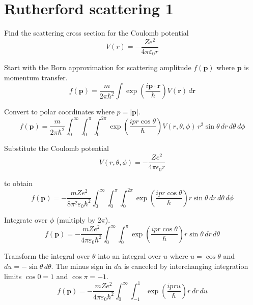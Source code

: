 


\section*{Rutherford scattering 1}

Find the scattering cross section for the Coulomb potential
\begin{equation*}
V(r)=-\frac{Ze^2}{4\pi\varepsilon_0r}
\end{equation*}

Start with the Born approximation for scattering amplitude
$f(\mathbf p)$ where $\mathbf p$ is momentum transfer.
\begin{equation*}
f(\mathbf p)
=\frac{m}{2\pi\hbar^2}
\int\exp\left(\frac{i\mathbf p\cdot\mathbf r}{\hbar}\right)V(\mathbf r)\,d\mathbf r
\end{equation*}

Convert to polar coordinates where $p=|\mathbf p|$.
\begin{equation*}
f(\mathbf p)
=\frac{m}{2\pi\hbar^2}
\int_0^\infty
\int_0^\pi
\int_0^{2\pi}
\exp\left(\frac{ipr\cos\theta}{\hbar}\right)V(r,\theta,\phi)
\,r^2\sin\theta\,dr\,d\theta\,d\phi
\end{equation*}

Substitute the Coulomb potential
\begin{equation*}
V(r,\theta,\phi)=-\frac{Ze^2}{4\pi\epsilon_0r}
\end{equation*}

to obtain
\begin{equation*}
f(\mathbf p)
=-\frac{mZe^2}{8\pi^2\varepsilon_0\hbar^2}
\int_0^\infty
\int_0^\pi
\int_0^{2\pi}
\exp\left(\frac{ipr\cos\theta}{\hbar}\right)
r\sin\theta\,dr\,d\theta\,d\phi
\end{equation*}

Integrate over $\phi$ (multiply by $2\pi$).
\begin{equation*}
f(\mathbf p)
=-\frac{mZe^2}{4\pi\varepsilon_0\hbar^2}
\int_0^\infty
\int_0^\pi
\exp\left(\frac{ipr\cos\theta}{\hbar}\right)
r\sin\theta\,dr\,d\theta
\end{equation*}

Transform the integral over $\theta$ into an integral over $u$
where $u=\cos\theta$ and $du=-\sin\theta\,d\theta$.
The minus sign in $du$ is canceled by interchanging integration limits
$\cos0=1$ and $\cos\pi=-1$.
\begin{equation*}
f(\mathbf p)
=-\frac{mZe^2}{4\pi\varepsilon_0\hbar^2}
\int_0^\infty
\int_{-1}^1
\exp\left(\frac{ipru}{\hbar}\right)
r\,dr\,du
\end{equation*}

